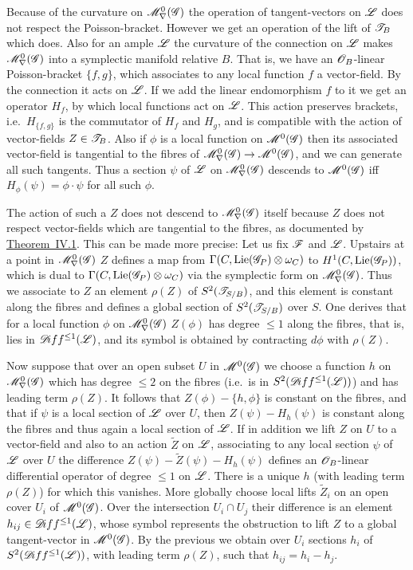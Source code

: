\documentclass[12pt,english]{smfart}
\theoremstyle{plain} \newtheorem{innerthm}{Theorem} \newtheorem{innerlem}{Lemma} \newtheorem{innerprop}{Proposition} \newtheorem{innercor}{Corollary} \theoremstyle{definition} \newtheorem{innerdefn}{Definition} \newtheorem{innerconstr}{Construction} \theoremstyle{remark} \newtheorem*{remark}{Remark} \newtheorem*{remarks}{Remarks} \newtheorem*{applications}{Applications}
\newcommand{\refthm}[1]{\hyperref[thm:#1]{Theorem~#1}} \newcommand{\reflem}[1]{\hyperref[lem:#1]{Lemma~#1}} \newcommand{\refprop}[1]{\hyperref[prop:#1]{Proposition~#1}} \newcommand{\refcor}[1]{\hyperref[cor:#1]{Corollary~#1}} \newcommand{\refdef}[1]{\hyperref[def:#1]{Definition~#1}} \newcommand{\refconstr}[1]{\hyperref[constr:#1]{Construction~#1}} \newcommand{\refsec}[1]{\hyperref[sec:#1]{\S#1}}
\begin{document}
Because of the curvature on $\mathscr{M}^0_\nabla(\mathscr{G})$ the operation of tangent-vectors on $\mathscr{L}$ does not respect the Poisson-bracket. However we get an operation of the lift of $\mathscr{T}_B$ which does. Also for an ample $\mathscr{L}$ the curvature of the connection on $\mathscr{L}$ makes $\mathscr{M}^0_\nabla(\mathscr{G})$ into a symplectic manifold relative $B$. That is, we have an $\mathscr{O}_B$-linear Poisson-bracket $\{f,g\}$, which associates to any local function $f$ a vector-field. By the connection it acts on $\mathscr{L}$. If we add the linear endomorphism $f$ to it we get an operator $H_f$, by which local functions act on $\mathscr{L}$. This action preserves brackets, i.e.\ $H_{\{f,g\}}$ is the commutator of $H_f$ and $H_g$, and is compatible with the action of vector-fields $Z\in\mathscr{T}_B$. Also if $\phi$ is a local function on $\mathscr{M}^0(\mathscr{G})$ then its associated vector-field is tangential to the fibres of $\mathscr{M}^0_\nabla(\mathscr{G})\to\mathscr{M}^0(\mathscr{G})$, and we can generate all such tangents. Thus a section $\psi$ of $\mathscr{L}$ on $\mathscr{M}^0_\nabla(\mathscr{G})$ descends to $\mathscr{M}^0(\mathscr{G})$ iff $H_\phi(\psi)=\phi\cdot\psi$ for all such $\phi$.

The action of such a $Z$ does not descend to $\mathscr{M}^0_\nabla(\mathscr{G})$ itself because $Z$ does not respect vector-fields which are tangential to the fibres, as documented by \refthm{IV.1}. This can be made more precise: Let us fix $\mathscr{F}$ and $\mathscr{L}$. Upstairs at a point in $\mathscr{M}^0_\nabla(\mathscr{G})$ $Z$ defines a map from $\Gamma(C,\operatorname{Lie}(\mathscr{G}_P)\otimes\omega_C)$ to $H^1(C,\operatorname{Lie}(\mathscr{G}_P))$, which is dual to $\Gamma(C,\operatorname{Lie}(\mathscr{G}_P)\otimes\omega_C)$ via the symplectic form on $\mathscr{M}^0_\nabla(\mathscr{G})$. Thus we associate to $Z$ an element $\rho(Z)$ of $S^2(\mathscr{T}_{S/B})$, and this element is constant along the fibres and defines a global section of $S^2(\mathscr{T}_{S/B})$ over $S$. One derives that for a local function $\phi$ on $\mathscr{M}^0_\nabla(\mathscr{G})$ $Z(\phi)$ has degree $\le 1$ along the fibres, that is, lies in $\mathscr{D}\!iff^{\le 1}(\mathscr{L})$, and its symbol is obtained by contracting $d\phi$ with $\rho(Z)$.


Now suppose that over an open subset $U$ in $\mathscr{M}^0(\mathscr{G})$ we choose a function $h$ on $\mathscr{M}^0_\nabla(\mathscr{G})$ which has degree $\le 2$ on the fibres (i.e.\ is in $S^2(\mathscr{D}\!iff^{\le 1}(\mathscr{L}))$) and has leading term $\rho(Z)$. It follows that $Z(\phi)-\{h,\phi\}$ is constant on the fibres, and that if $\psi$ is a local section of $\mathscr{L}$ over $U$, then $Z(\psi)-H_h(\psi)$ is constant along the fibres and thus again a local section of $\mathscr{L}$. If in addition we lift $Z$ on $U$ to a vector-field and also to an action $\widetilde{Z}$ on $\mathscr{L}$, associating to any local section $\psi$ of $\mathscr{L}$ over $U$ the difference $Z(\psi)-\widetilde{Z}(\psi)-H_h(\psi)$ defines an $\mathscr{O}_B$-linear differential operator of degree $\le 1$ on $\mathscr{L}$. There is a unique $h$ (with leading term $\rho(Z)$) for which this vanishes. More globally choose local lifts $\widetilde{Z}_i$ on an open cover $U_i$ of $\mathscr{M}^0(\mathscr{G})$. Over the intersection $U_i\cap U_j$ their difference is an element $h_{ij}\in\mathscr{D}\!iff^{\le 1}(\mathscr{L})$, whose symbol represents the obstruction to lift $Z$ to a global tangent-vector in $\mathscr{M}^0(\mathscr{G})$. By the previous we obtain over $U_i$ sections $h_i$ of $S^2(\mathscr{D}\!iff^{\le 1}(\mathscr{L}))$, with leading term $\rho(Z)$, such that $h_{ij}=h_i-h_j$.
\end{document}
